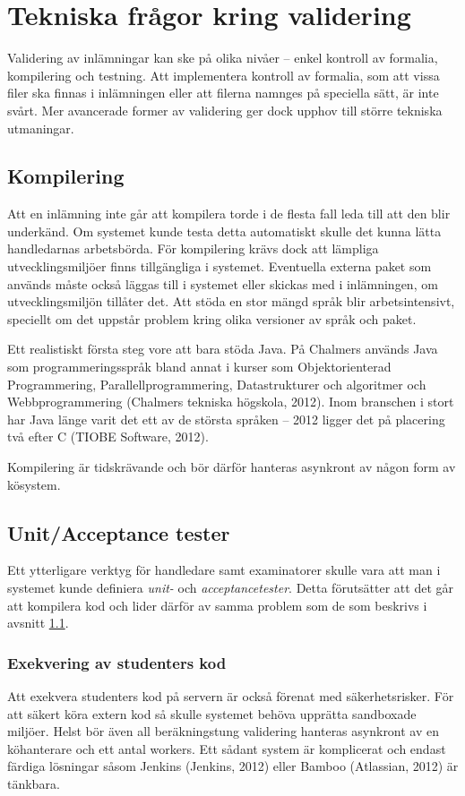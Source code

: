 \section{Tekniska frågor kring validering}

Validering av inlämningar kan ske på olika nivåer – enkel kontroll av formalia, kompilering och testning. 
Att implementera kontroll av formalia, som att vissa filer ska finnas i inlämningen eller att filerna namnges på speciella sätt, är inte svårt. Mer avancerade former av validering ger dock upphov till större tekniska utmaningar.

\subsection{Kompilering}
\label{section:kompilering}

Att en inlämning inte går att kompilera torde i de flesta fall leda till att den blir underkänd. Om systemet kunde testa detta automatiskt skulle det kunna lätta handledarnas arbetsbörda.
För kompilering krävs dock att lämpliga utvecklingsmiljöer finns tillgängliga i systemet. Eventuella externa paket som används måste också läggas till i systemet eller skickas med i inlämningen, om utvecklingsmiljön tillåter det.
Att stöda en stor mängd språk blir arbetsintensivt, speciellt om det uppstår problem kring olika versioner av språk och paket.

Ett realistiskt första steg vore att bara stöda Java. På Chalmers används Java som programmeringsspråk bland annat i kurser som Objektorienterad Programmering, Parallellprogrammering, Datastrukturer och algoritmer och Webbprogrammering (Chalmers tekniska högskola, 2012). Inom branschen i stort har Java länge varit det ett av de största språken – 2012 ligger det på placering två efter C (TIOBE Software, 2012).

Kompilering är tidskrävande och bör därför hanteras asynkront av någon form av kösystem.

\subsection{Unit/Acceptance tester}
Ett ytterligare verktyg för handledare samt examinatorer skulle vara att man i systemet kunde definiera \emph{unit-} och \emph{acceptancetester}. Detta förutsätter att det går att kompilera kod och lider därför av samma problem som de som beskrivs i avsnitt \ref{section:kompilering}.
\subsubsection{Exekvering av studenters kod}
Att exekvera studenters kod på servern är också förenat med säkerhetsrisker.
För att säkert köra extern kod så skulle systemet behöva upprätta sandboxade miljöer. Helst bör även all beräkningstung validering hanteras asynkront av en köhanterare och ett antal workers. Ett sådant system är komplicerat och endast färdiga lösningar såsom Jenkins (Jenkins, 2012) eller Bamboo (Atlassian, 2012) är tänkbara.

